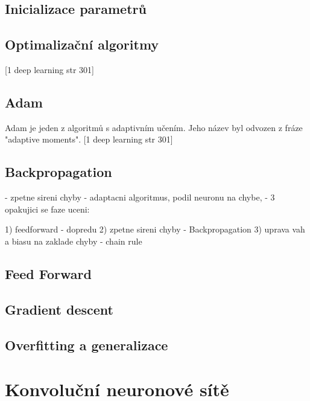 \subsection{Inicializace parametrů}


\subsection{Optimalizační algoritmy}
 [1 deep learning str 301]

\subsection*{Adam}


Adam je jeden z algoritmů s adaptivním učením. Jeho název byl odvozen z fráze "adaptive moments".  [1 deep learning str 301]


\subsection{Backpropagation}
- zpetne sireni chyby
- adaptacni algoritmus, podil neuronu na chybe,
- 3 opakujici se faze uceni:


1) feedforward - dopredu
2) zpetne sireni chyby - Backpropagation
3) uprava vah a biasu na zaklade chyby
- chain rule



\subsection*{Feed Forward}

\subsection*{Gradient descent}

\subsection{Overfitting a generalizace}


\section{Konvoluční neuronové sítě}

